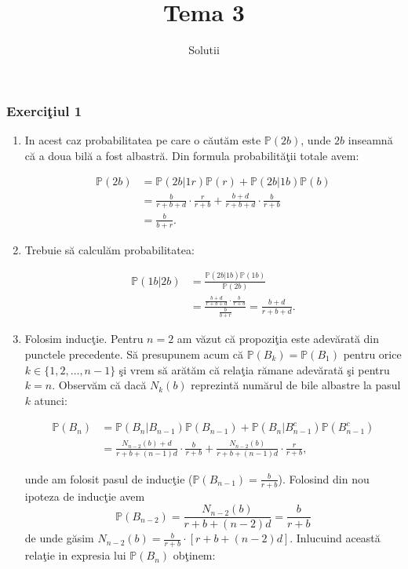 \documentclass[]{article}
\title{Tema 3}
\subtitle{Solutii}
\author{}
\date{}
\providecommand{\tightlist}{%
  \setlength{\itemsep}{0pt}\setlength{\parskip}{0pt}}
\def\PP{{\mathbb P}}
\begin{document}
\maketitle

\thispagestyle{fancy}

\subsubsection{\texorpdfstring{Exerci\c tiul
1}{Exerciiul 1}}\label{exerciiul-1}

\begin{enumerate}
\def\labelenumi{\alph{enumi})}
\tightlist
\item
  In acest caz probabilitatea pe care o c\u aut\u am este \(\PP(2b)\),
  unde \(2b\) inseamn\u a c\u a a doua bil\u a a fost albastr\u a. Din
  formula probabilit\u a\c tii totale avem:

  \begin{align*}
  \PP(2b)&=\PP(2b|1r)\PP(r)+\PP(2b|1b)\PP(b)\\
  &=\frac{b}{r+b+d}\cdot\frac{r}{r+b}+\frac{b+d}{r+b+d}\cdot\frac{b}{r+b}\\
  &=\frac{b}{b+r}.
  \end{align*}
\item
  Trebuie s\u a calcul\u am probabilitatea:

  \begin{align*}
  \PP(1b|2b)&=\frac{\PP(2b|1b)\PP(1b)}{\PP(2b)}\\
  &=\frac{\frac{b+d}{r+b+d}\cdot\frac{b}{r+b}}{\frac{b}{b+r}}=\frac{b+d}{r+b+d}.
  \end{align*}
\item
  Folosim induc\c tie. Pentru \(n=2\) am v\u azut c\u a propozi\c tia
  este adev\u arat\u a din punctele precedente. S\u a presupunem acum
  c\u a \(\PP(B_k)=\PP(B_1)\) pentru orice \(k\in\{1,2,\dots,n-1\}\)
  \c si vrem s\u a ar\u at\u am c\u a rela\c tia r\u amane
  adev\u arat\u a \c si pentru \(k=n\). Observ\u am c\u a dac\u a
  \(N_k(b)\) reprezint\u a num\u arul de bile albastre la pasul \(k\)
  atunci:

  \begin{align*}
  \PP(B_n)&=\PP(B_n|B_{n-1})\PP(B_{n-1})+\PP(B_n|B_{n-1}^c)\PP(B_{n-1}^c)\\
  &=\frac{N_{n-2}(b)+d}{r+b+(n-1)d}\cdot\frac{b}{r+b}+\frac{N_{n-2}(b)}{r+b+(n-1)d}\cdot\frac{r}{r+b},
  \end{align*}

  unde am folosit pasul de induc\c tie (\(\PP(B_{n-1})=\frac{b}{r+b}\)).
  Folosind din nou ipoteza de induc\c tie avem \[
  \PP(B_{n-2})=\frac{N_{n-2}(b)}{r+b+(n-2)d}=\frac{b}{r+b}
  \] de unde g\u asim \(N_{n-2}(b)=\frac{b}{r+b}\cdot[r+b+(n-2)d]\).
  Inlucuind aceast\u a rela\c tie in expresia lui \(\PP(B_n)\)
  ob\c tinem:


\end{enumerate}
\end{document}

